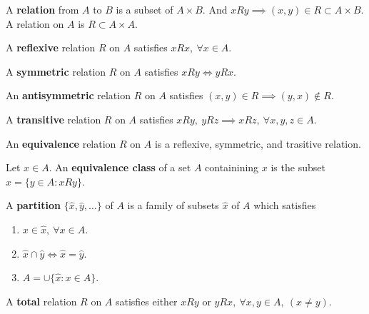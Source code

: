 \begin{definition}
	A \textbf{relation} from $A$ to $B$ is a subset of $A \times B$.
	And $xRy \implies (x,y) \in R \subset A \times B$.
	A relation on $A$ is $R \subset A \times A$.
\end{definition}

\begin{definition}
	A \textbf{reflexive} relation $R$ on $A$ satisfies $xRx,\ \forall x \in A$.
\end{definition}

\begin{definition}
	A \textbf{symmetric} relation $R$ on $A$ satisfies $xRy \iff yRx$.
\end{definition}

\begin{definition}
	An \textbf{antisymmetric} relation $R$ on $A$ satisfies $(x,y) \in R \implies (y,x) \notin R$.
\end{definition}

\begin{definition}
	A \textbf{transitive} relation $R$ on $A$ satisfies $xRy,\ yRz \implies xRz,\ \forall x,y,z \in A$.
\end{definition}

\begin{definition}
	An \textbf{equivalence} relation $R$ on $A$ is a reflexive, symmetric, and trasitive relation.
\end{definition}

\begin{definition}
	Let $x \in A$.
	An \textbf{equivalence class} of a set $A$ containining $x$ is the subset $\hat{x} = \{ y \in A : xRy \}$.
\end{definition}

\begin{definition}
	A \textbf{partition} $\{\hat{x},\hat{y},\dots\}$ of $A$ is a family of subsets $\hat{x}$ of $A$ which satisfies
	\begin{enumerate}
		\item $x \in \hat{x},\ \forall x \in A$.
		\item $\hat{x} \cap \hat{y} \iff \hat{x} = \hat{y}$.
		\item $A = \cup \{ \hat{x} : x \in A\}$.
	\end{enumerate}
\end{definition}

\begin{definition}
	A \textbf{total} relation $R$ on $A$ satisfies either $xRy \text{ or } yRx,\ \forall x,y \in A,\ (x \ne y)$.
\end{definition}

